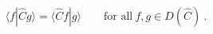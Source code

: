 \begin{equation}
\langle f | \hat{C} g \rangle = \langle \hat{C} f | g \rangle \qquad 
\mbox{for all} \ f,g \in D(\hat{C} ) \ .
\end{equation}

